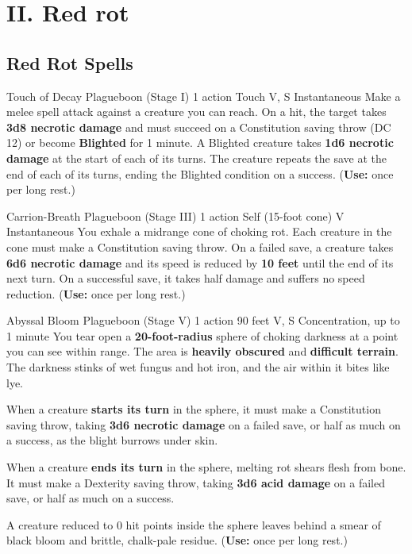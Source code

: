 \section{II. Red rot}
\label{app:redrot}
\subsection{Red Rot Spells}

\DndSpellHeader%
  {Touch of Decay}
  {Plagueboon (Stage I)}
  {1 action}
  {Touch}
  {V, S}
  {Instantaneous}
Make a melee spell attack against a creature you can reach. On a hit, the target takes \textbf{3d8 necrotic damage} and must succeed on a Constitution saving throw (DC 12) or become \textbf{Blighted} for 1 minute. A Blighted creature takes \textbf{1d6 necrotic damage} at the start of each of its turns. The creature repeats the save at the end of each of its turns, ending the Blighted condition on a success.
(\textbf{Use:} once per long rest.)

\medskip

\DndSpellHeader%
  {Carrion-Breath}
  {Plagueboon (Stage III)}
  {1 action}
  {Self (15-foot cone)}
  {V}
  {Instantaneous}
You exhale a midrange cone of choking rot. Each creature in the cone must make a Constitution saving throw. On a failed save, a creature takes \textbf{6d6 necrotic damage} and its speed is reduced by \textbf{10 feet} until the end of its next turn. On a successful save, it takes half damage and suffers no speed reduction.
(\textbf{Use:} once per long rest.)

\medskip

\DndSpellHeader%
  {Abyssal Bloom}
  {Plagueboon (Stage V)}
  {1 action}
  {90 feet}
  {V, S}
  {Concentration, up to 1 minute}
You tear open a \textbf{20-foot-radius} sphere of choking darkness at a point you can see within range. The area is \textbf{heavily obscured} and \textbf{difficult terrain}. The darkness stinks of wet fungus and hot iron, and the air within it bites like lye.

When a creature \textbf{starts its turn} in the sphere, it must make a Constitution saving throw, taking \textbf{3d6 necrotic damage} on a failed save, or half as much on a success, as the blight burrows under skin.

When a creature \textbf{ends its turn} in the sphere, melting rot shears flesh from bone. It must make a Dexterity saving throw, taking \textbf{3d6 acid damage} on a failed save, or half as much on a success.

A creature reduced to 0 hit points inside the sphere leaves behind a smear of black bloom and brittle, chalk-pale residue.
(\textbf{Use:} once per long rest.)

\newpage
